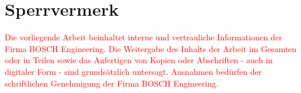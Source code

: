 \section*{Sperrvermerk}
\textcolor{red}{
Die vorliegende Arbeit beinhaltet interne und vertrauliche Informationen der Firma BOSCH Engineering.
Die Weitergabe des Inhalts der Arbeit im Gesamten oder in Teilen sowie das Anfertigen
von Kopien oder Abschriften - auch in digitaler Form - sind grundsätzlich untersagt.
Ausnahmen bedürfen der schriftlichen Genehmigung der Firma BOSCH Engineering.
}
